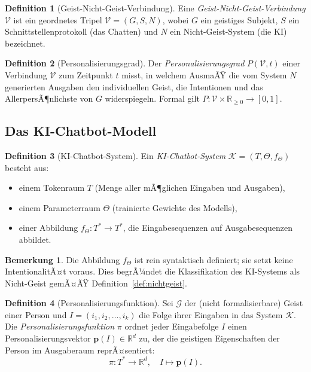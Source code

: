 ﻿\documentclass[a4paper,12pt]{article}
\theoremstyle{definition}
\newtheorem{definition}{Definition}
\newtheorem{bemerkung}{Bemerkung}
\begin{document}
\begin{definition}[Geist-Nicht-Geist-Verbindung]
\label{def:verbindung}
Eine \emph{Geist-Nicht-Geist-Verbindung} $\mathcal{V}$ ist ein geordnetes Tripel
$\mathcal{V} = (G, S, N)$, wobei $G$ ein geistiges Subjekt, $S$ ein Schnittstellenprotokoll
(das Chatten) und $N$ ein Nicht-Geist-System (die KI) bezeichnet.
\end{definition}

\begin{definition}[Personalisierungsgrad]
\label{def:pers}
Der \emph{Personalisierungsgrad} $P(\mathcal{V}, t)$ einer Verbindung $\mathcal{V}$ zum
Zeitpunkt $t$ misst, in welchem AusmaÃŸ die vom System $N$ generierten Ausgaben den
individuellen Geist, die Intentionen und das AllerpersÃ¶nlichste von $G$ widerspiegeln.
Formal gilt $P : \mathcal{V} \times \mathbb{R}_{\geq 0} \to [0,1]$.
\end{definition}

\subsection{Das KI-Chatbot-Modell}

\begin{definition}[KI-Chatbot-System]
\label{def:kichat}
Ein \emph{KI-Chatbot-System} $\mathcal{K} = (T, \Theta, f_\Theta)$ besteht aus:
\begin{itemize}
    \item einem Tokenraum $T$ (Menge aller mÃ¶glichen Eingaben und Ausgaben),
    \item einem Parameterraum $\Theta$ (trainierte Gewichte des Modells),
    \item einer Abbildung $f_\Theta : T^* \to T^*$, die Eingabesequenzen auf
          Ausgabesequenzen abbildet.
\end{itemize}
\end{definition}

\begin{bemerkung}
Die Abbildung $f_\Theta$ ist rein syntaktisch definiert; sie setzt keine IntentionalitÃ¤t
voraus. Dies begrÃ¼ndet die Klassifikation des KI-Systems als Nicht-Geist gemÃ¤ÃŸ
Definition~\ref{def:nichtgeist}.
\end{bemerkung}

\begin{definition}[Personalisierungsfunktion]
\label{def:pfunc}
Sei $\mathcal{G}$ der (nicht formalisierbare) Geist einer Person und
$I = (i_1, i_2, \ldots, i_k)$ die Folge ihrer Eingaben in das System $\mathcal{K}$.
Die \emph{Personalisierungsfunktion} $\pi$ ordnet jeder Eingabefolge $I$ einen
Personalisierungsvektor $\mathbf{p}(I) \in \mathbb{R}^d$ zu, der die geistigen
Eigenschaften der Person im Ausgaberaum reprÃ¤sentiert:
\[
    \pi : T^* \longrightarrow \mathbb{R}^d, \quad I \mapsto \mathbf{p}(I).
\]
\end{definition}
\end{document}
